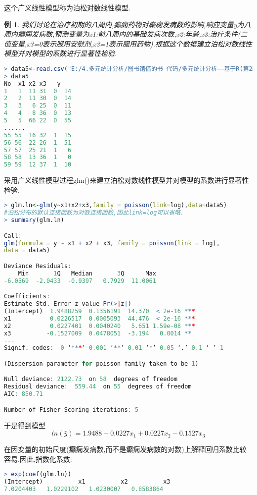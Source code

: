 \documentclass[11pt,a4paper,oneside]{book}
\newtheorem{e}{例}
\begin{document}
这个广义线性模型称为泊松对数线性模型.
\begin{e}
	我们讨论在治疗初期的八周内,癫痫药物对癫痫发病数的影响,响应变量y为八周内癫痫发病数,预测变量为x1:前八周内的基础发病次数,x2:年龄,x3:治疗条件(二值变量,x3=0表示服用安慰剂,x3=1表示服用药物).根据这个数据建立泊松对数线性模型并对模型的系数进行显著性检验.
\end{e}
\begin{lstlisting}[language=r]
> data5<-read.csv("E:/4.多元统计分析/图书馆借的书 代码/多元统计分析——基于R(第2版) R-data/eg3.3.csv",header=TRUE)
> data5
No  x1 x2 x3   y
1   1  11 31  0  14
2   2  11 30  0  14
3   3   6 25  0  11
4   4   8 36  0  13
5   5  66 22  0  55
......
55 55  16 32  1  15
56 56  22 26  1  51
57 57  25 21  1   6
58 58  13 36  1   0
59 59  12 37  1  10
\end{lstlisting}
采用广义线性模型过程glm()来建立泊松对数线性模型并对模型的系数进行显著性检验.
\begin{lstlisting}[language=r]
> glm.ln<-glm(y~x1+x2+x3,family = poisson(link=log),data=data5)
#泊松分布的默认连接函数为对数连接函数,因此link=log可以省略.
> summary(glm.ln)

Call:
glm(formula = y ~ x1 + x2 + x3, family = poisson(link = log), 
data = data5)

Deviance Residuals: 
    Min       1Q   Median       3Q      Max  
-6.0569  -2.0433  -0.9397   0.7929  11.0061  

Coefficients:
Estimate Std. Error z value Pr(>|z|)    
(Intercept)  1.9488259  0.1356191  14.370  < 2e-16 ***
x1           0.0226517  0.0005093  44.476  < 2e-16 ***
x2           0.0227401  0.0040240   5.651 1.59e-08 ***
x3          -0.1527009  0.0478051  -3.194   0.0014 ** 
---
Signif. codes:  0 ‘***’ 0.001 ‘**’ 0.01 ‘*’ 0.05 ‘.’ 0.1 ‘ ’ 1

(Dispersion parameter for poisson family taken to be 1)

Null deviance: 2122.73  on 58  degrees of freedom
Residual deviance:  559.44  on 55  degrees of freedom
AIC: 850.71

Number of Fisher Scoring iterations: 5
\end{lstlisting}
于是得到模型
\[ln(\hat{y})=1.9488+0.0227x_1+0.0227x_2-0.1527x_3\]

在因变量的初始尺度(癫痫发病数,而不是癫痫发病数的对数)上解释回归系数比较容易,因此,指数化系数:
\begin{lstlisting}[language=r]
> exp(coef(glm.ln))
(Intercept)          x1          x2          x3 
7.0204403   1.0229102   1.0230007   0.8583864 
\end{lstlisting}
\end{document}
